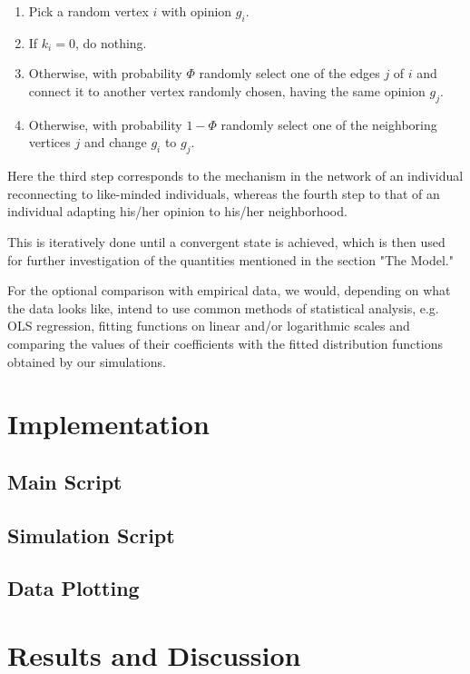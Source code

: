 \documentclass[11pt]{article}
\begin{document}
\begin{enumerate}
\item Pick a random vertex $i$ with opinion $g_i$. 
\item If $k_i=0$, do nothing. 
\item Otherwise, with probability $\Phi$ randomly select one of the edges $j$ of $i$ and connect it to another vertex randomly chosen, having the same opinion $g_j$.
\item Otherwise, with probability $1-\Phi$ randomly select one of the neighboring vertices $j$ and change $g_i$ to $g_j$.
\end{enumerate}


Here the third step corresponds to the mechanism in the network of an individual reconnecting to like-minded individuals, whereas the fourth step to that of an individual adapting his/her opinion to his/her neighborhood. 

This is iteratively done until a convergent state is achieved, which is then used for further investigation of the quantities mentioned in the section "The  Model."

For the optional comparison with empirical data, we would, depending on what the data looks like, intend to use common methods of statistical analysis, e.g. OLS regression, fitting functions on linear and/or logarithmic scales and comparing the values of their coefficients with the fitted distribution functions obtained by our simulations.



\section{Implementation}

\subsection{Main Script}

\subsection{Simulation Script}

\subsection{Data Plotting}

\section{Results and Discussion}
\end{document}
